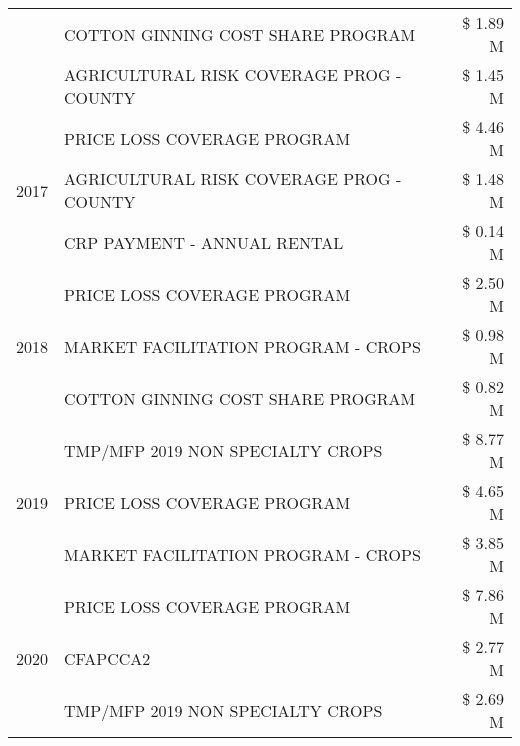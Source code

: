 \begin{tabular}{llr}
 & COTTON GINNING COST SHARE PROGRAM & \$ 1.89 M \\
 & AGRICULTURAL RISK COVERAGE PROG - COUNTY & \$ 1.45 M \\
\cline{1-3}
\multirow[t]{3}{*}{2017} & PRICE LOSS COVERAGE PROGRAM & \$ 4.46 M \\
 & AGRICULTURAL RISK COVERAGE PROG - COUNTY & \$ 1.48 M \\
 & CRP PAYMENT - ANNUAL RENTAL & \$ 0.14 M \\
\cline{1-3}
\multirow[t]{3}{*}{2018} & PRICE LOSS COVERAGE PROGRAM & \$ 2.50 M \\
 & MARKET FACILITATION PROGRAM - CROPS & \$ 0.98 M \\
 & COTTON GINNING COST SHARE PROGRAM & \$ 0.82 M \\
\cline{1-3}
\multirow[t]{3}{*}{2019} & TMP/MFP 2019 NON SPECIALTY CROPS & \$ 8.77 M \\
 & PRICE LOSS COVERAGE PROGRAM & \$ 4.65 M \\
 & MARKET FACILITATION PROGRAM - CROPS & \$ 3.85 M \\
\cline{1-3}
\multirow[t]{3}{*}{2020} & PRICE LOSS COVERAGE PROGRAM & \$ 7.86 M \\
 & CFAPCCA2 & \$ 2.77 M \\
 & TMP/MFP 2019 NON SPECIALTY CROPS & \$ 2.69 M \\
\cline{1-3}
\bottomrule
\end{tabular}

